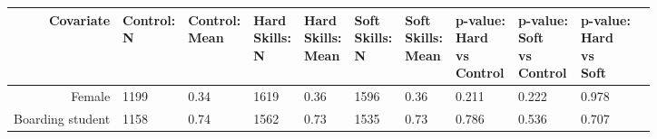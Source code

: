 \setlength\extrarowheight{10pt}

  \begin{longtable}{|r|l|l|l|l|l|l|l|l|l|l}

\hline
 Covariate & \makecell{Control:\\ N} & \makecell{Control:\\ Mean} & \makecell{Hard \\Skills:\\ N} & \makecell{Hard \\Skills:\\ Mean} & \makecell{Soft \\Skills:\\ N} & \makecell{Soft \\Skills:\\ Mean} & \makecell{p-value:\\Hard \\vs \\Control} & \makecell{p-value:\\Soft \\vs \\Control} & \makecell{p-value:\\Hard \\vs \\Soft}\\

\hline

	 Female                                                             & 1199                                                               &  0.34                                                              & 1619                                                               &  0.36                                                              & 1596                                                               &  0.36                                                              & 0.211                                                              & 0.222                                                              & 0.978                                                             \\

\hline 

	 Boarding student                                                   & 1158                                                               &  0.74                                                              & 1562                                                               &  0.73                                                              & 1535                                                               &  0.73                                                              & 0.786                                                              & 0.536                                                              & 0.707                                                             \\


\end{longtable}
